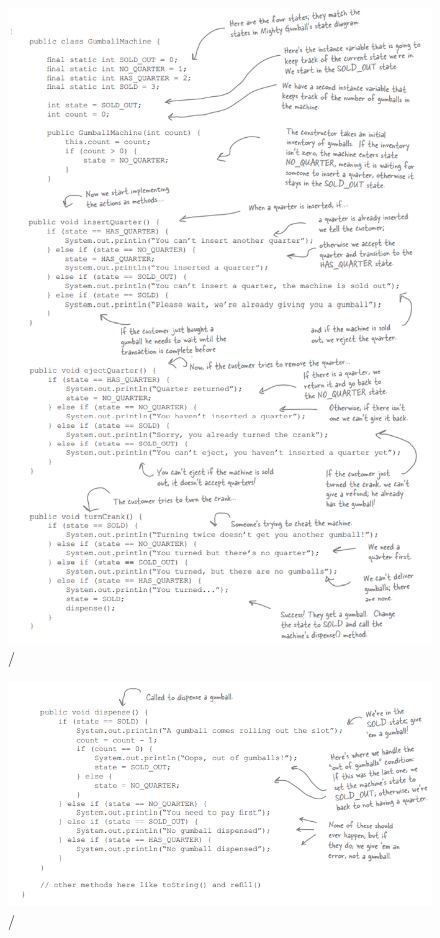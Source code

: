 \begin{figure}[!htb]
    \centering
    \includegraphics[width=\textwidth]{fig/State/GumballMachine_390.png}/
\end{figure}
\begin{figure}[!htb]
    \centering
    \includegraphics[width=\textwidth]{fig/State/GumballMachine_390_2.png}/
\end{figure}\smallskip

